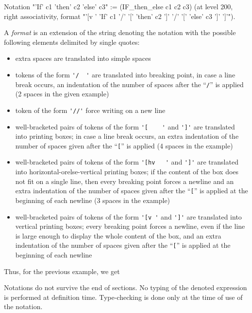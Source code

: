 \begin{small}
\begin{coq_example}
Notation "'If' c1 'then' c2 'else' c3" := (IF_then_else c1 c2 c3)
 (at level 200, right associativity, format
  "'[v   ' 'If'  c1 '/' '[' 'then'  c2  ']' '/' '[' 'else'  c3 ']' ']'").
\end{coq_example}
\end{small}

A {\em format} is an extension of the string denoting the notation with
the possible following elements delimited by single quotes:

\begin{itemize}
\item extra spaces are translated into simple spaces
\item tokens of the form \verb='/  '= are translated into breaking point,
  in case a line break occurs, an indentation of the number of spaces
  after the ``\verb=/='' is applied (2 spaces in the given example)
\item token of the form \verb='//'= force writing on a new line
\item well-bracketed pairs of tokens of the form \verb='[    '= and \verb=']'=
  are translated into printing boxes; in case a line break occurs,
  an extra indentation of the number of spaces given after the ``\verb=[=''
  is applied (4 spaces in the example)
\item well-bracketed pairs of tokens of the form \verb='[hv   '= and \verb=']'=
  are translated into horizontal-orelse-vertical printing boxes; 
  if the content of the box does not fit on a single line, then every breaking
  point forces a newline and an extra  indentation of the number of spaces
  given after the ``\verb=[='' is applied at the beginning of each newline
  (3 spaces in the example)
\item well-bracketed pairs of tokens of the form \verb='[v '= and
  \verb=']'= are translated into vertical printing boxes; every
  breaking point forces a newline, even if the line is large enough to
  display the whole content of the box, and an extra indentation of the
  number of spaces given after the ``\verb=[='' is applied at the beginning
  of each newline
\end{itemize}

Thus, for the previous example, we get

Notations do not survive the end of sections. No typing of the denoted
expression is performed at definition time. Type-checking is done only
at the time of use of the notation.

